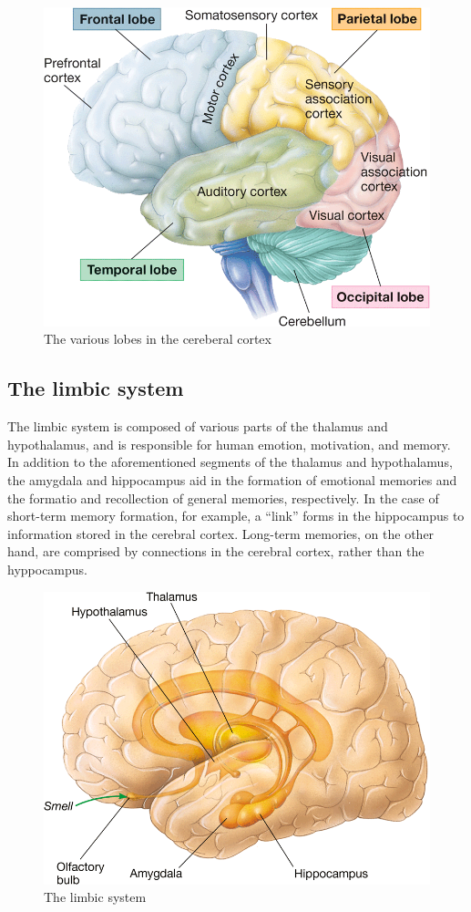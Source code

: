\documentclass{article}
\begin{document}
\bigbreak{}

\begin{figure}[h]
	\centering
	\includegraphics[width=0.35\linewidth]{lobes.png}
	\caption{The various lobes in the cereberal cortex}
\end{figure}

\subsection{The limbic system}

The limbic system is composed of various parts of the thalamus and hypothalamus,
and is responsible for human emotion, motivation, and memory. In addition to the
aforementioned segments of the thalamus and hypothalamus, the amygdala and
hippocampus aid in the formation of emotional memories and the formatio and
recollection of general memories, respectively. In the case of short-term
memory formation, for example, a ``link'' forms in the hippocampus to information
stored in the cerebral cortex. Long-term memories, on the other hand, are comprised
by connections in the cerebral cortex, rather than the hyppocampus.

\bigbreak{}

\begin{figure}[h]
	\centering
	\includegraphics[width=0.7\linewidth]{limbic_system.png}
	\caption{The limbic system}
\end{figure}
\end{document}
